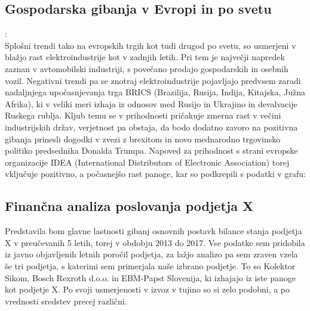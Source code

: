 \documentclass[12pt,a4paper]{amsart}
\theoremstyle{definition} %
\theoremstyle{plain} %
\begin{document}
\subsection{Gospodarska gibanja v Evropi in po svetu}:\\
Splošni trendi tako na evropskih trgih kot tudi drugod po svetu, so usmerjeni v blažjo rast elektroindustrije kot v zadnjih letih. Pri tem je največji napredek zaznan v avtomobilski industriji, s povečano prodajo gospodarskih in osebnih vozil. Negativni trendi pa se znotraj elektroindustrije pojavljajo predvsem zaradi nadaljnjega upočasnjevanja trga BRICS (Brazilija, Rusija, Indija, Kitajska, Južna Afrika), ki v veliki meri izhaja iz odnosov med Rusijo in Ukrajino in devalvacije Ruskega rublja. %
Kljub temu se v prihodnosti pričakuje zmerna rast v večini industrijskih držav, verjetnost pa obstaja, da bodo dodatno zavoro na pozitivna gibanja prinesli dogodki v zvezi z brexitom in novo mednarodno trgovinsko politiko predsednika Donalda Trumpa. Napoved za prihodnost s strani evropske organizacije IDEA (International Distributors of Electronic Association) torej vključuje pozitivno, a počasnejšo rast panoge, kar so podkrepili s podatki v grafu:



\subsection{Finančna analiza poslovanja podjetja X}
Predstavila bom glavne lastnosti gibanj osnovnih postavk bilance stanja podjetja X v preučevanih 5 letih, torej v obdobju 2013 do 2017. Vse podatke sem pridobila iz javno objavljenih letnih poročil podjetja, za lažjo analizo pa sem zraven vzela še tri podjetja, s katerimi sem primerjala naše izbrano podjetje. To so Kolektor Sikom, Bosch Rexroth d.o.o. in EBM-Papst Slovenija, ki izhajajo iz iste panoge kot podjetje X. Po svoji usmerjenosti v izvoz v tujino so si zelo podobni, a po vrednosti sredstev precej različni.
\end{document}

